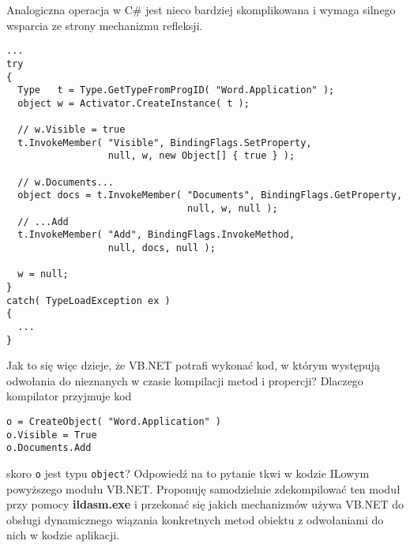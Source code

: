 Analogiczna operacja w C\# jest nieco bardziej skomplikowana i wymaga silnego wsparcia
ze strony mechanizmu refleksji.

\begin{scriptsize}
\begin{verbatim}
...
try
{
  Type   t = Type.GetTypeFromProgID( "Word.Application" );
  object w = Activator.CreateInstance( t );

  // w.Visible = true
  t.InvokeMember( "Visible", BindingFlags.SetProperty, 
                  null, w, new Object[] { true } );

  // w.Documents...
  object docs = t.InvokeMember( "Documents", BindingFlags.GetProperty, 
                                null, w, null );
  // ...Add
  t.InvokeMember( "Add", BindingFlags.InvokeMethod, 
                  null, docs, null );
									
  w = null;
}
catch( TypeLoadException ex )
{
  ...
}		
\end{verbatim}
\end{scriptsize}

Jak to się więc dzieje, że VB.NET potrafi wykonać kod, w którym występują odwołania do nieznanych
w czasie kompilacji metod i propercji? Dlaczego kompilator przyjmuje kod

\begin{scriptsize}
\begin{verbatim}
o = CreateObject( "Word.Application" )
o.Visible = True
o.Documents.Add
\end{verbatim}
\end{scriptsize}

skoro {\tt o} jest typu {\tt object}? Odpowiedź na to pytanie tkwi w kodzie ILowym powyższego 
modułu VB.NET. Proponuję samodzielnie zdekompilować ten moduł przy pomocy {\bf ildasm.exe} i przekonać się
jakich mechanizmów używa VB.NET do obsługi dynamicznego wiązania konkretnych metod obiektu z odwołaniami
do nich w kodzie aplikacji.